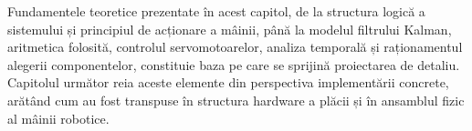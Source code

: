 \vspace{0.5cm}
\noindent
Fundamentele teoretice prezentate în acest capitol, de la structura logică a
sistemului și principiul de acționare a mâinii, până la modelul filtrului Kalman,
aritmetica folosită, controlul servomotoarelor, analiza temporală și raționamentul
alegerii componentelor, constituie baza pe care se sprijină proiectarea de detaliu.
Capitolul următor reia aceste elemente din perspectiva implementării concrete,
arătând cum au fost transpuse în structura hardware a plăcii și în ansamblul fizic
al mâinii robotice.
